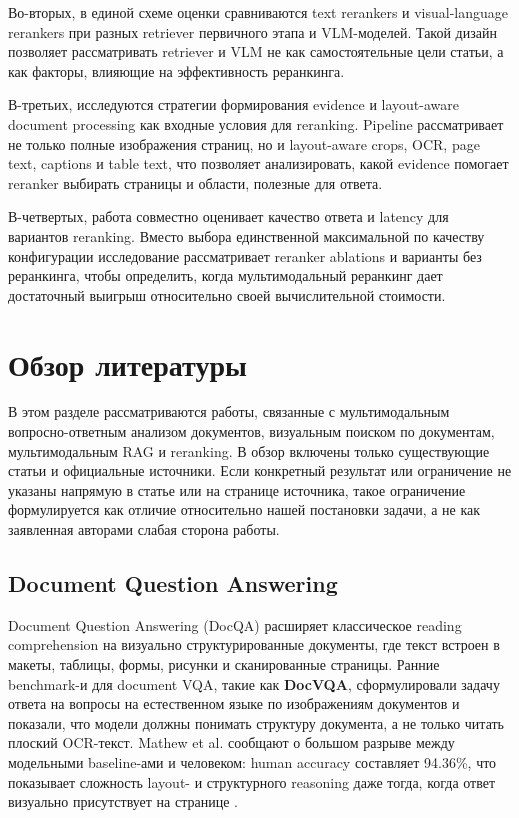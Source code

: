 \documentclass[conference]{IEEEtran}
\begin{document}
Во-вторых, в единой схеме оценки сравниваются text rerankers и visual-language rerankers при разных retriever первичного этапа и VLM-моделей. Такой дизайн позволяет рассматривать retriever и VLM не как самостоятельные цели статьи, а как факторы, влияющие на эффективность реранкинга.

В-третьих, исследуются стратегии формирования evidence и layout-aware document processing как входные условия для reranking. Pipeline рассматривает не только полные изображения страниц, но и layout-aware crops, OCR, page text, captions и table text, что позволяет анализировать, какой evidence помогает reranker выбирать страницы и области, полезные для ответа.

В-четвертых, работа совместно оценивает качество ответа и latency для вариантов reranking. Вместо выбора единственной максимальной по качеству конфигурации исследование рассматривает reranker ablations и варианты без реранкинга, чтобы определить, когда мультимодальный реранкинг дает достаточный выигрыш относительно своей вычислительной стоимости.


\section{Обзор литературы}

В этом разделе рассматриваются работы, связанные с мультимодальным вопросно-ответным анализом документов, визуальным поиском по документам, мультимодальным RAG и reranking. В обзор включены только существующие статьи и официальные источники. Если конкретный результат или ограничение не указаны напрямую в статье или на странице источника, такое ограничение формулируется как отличие относительно нашей постановки задачи, а не как заявленная авторами слабая сторона работы.

\subsection{Document Question Answering}

Document Question Answering (DocQA) расширяет классическое reading comprehension на визуально структурированные документы, где текст встроен в макеты, таблицы, формы, рисунки и сканированные страницы. Ранние benchmark-и для document VQA, такие как \textbf{DocVQA}, сформулировали задачу ответа на вопросы на естественном языке по изображениям документов и показали, что модели должны понимать структуру документа, а не только читать плоский OCR-текст. Mathew et al. сообщают о большом разрыве между модельными baseline-ами и человеком: human accuracy составляет 94.36\%, что показывает сложность layout- и структурного reasoning даже тогда, когда ответ визуально присутствует на странице \cite{docvqa2020}.
\end{document}
